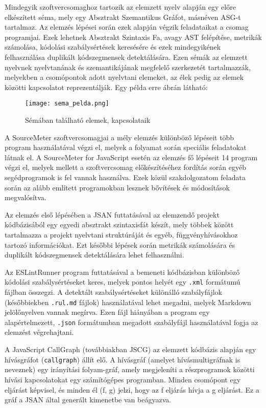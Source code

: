 Mindegyik szoftvercsomaghoz tartozik az elemzett nyelv alapján egy előre elkészített séma, mely egy Absztrakt Szemantikus Gráfot, másnéven ASG-t tartalmaz. Az elemzés lépései során ezek alapján végzik feladataikat a csomag programjai. Ezek lehetnek Absztrakt Szintaxis Fa, avagy AST felépítése, metrikák számolása, kódolási szabálysértések keresésére és ezek mindegyikének felhasználása duplikált kódszegmensek detektálására.
Ezen sémák az elemzett nyelvnek nyelvtanának és szemantikájának megfelelő szerkezetét tartalmazzák, melyekben a csomópontok adott nyelvtani elemeket, az élek pedig az elemek közötti kapcsolatot reprezentálják. Egy példa erre  ábrán látható:

\begin{figure}[!htbp]
    \caption{Sémában található elemek, kapcsolataik}\label{fig:sema_pelda}
    \centering
    \texttt{[image: sema\_pelda.png]}
\end{figure}

A SourceMeter szoftvercsomagjai a mély elemzés különböző lépéseit több program használatával végzi el, melyek a folyamat során speciális feladatokat látnak el. A SourceMeter for JavaScript esetén az elemzés fő lépéseit 14 program végzi el, melyek mellett a szoftvercsomag előkészítéséhez fordítás során egyéb segédprogramok is fel vannak használva. Ezek közül szakdolgozatom feladata során az alább említett programokban lesznek bővítések és módosítások megvalósítva.

Az elemzés első lépésében a JSAN futtatásával az elemzendő projekt kódbázisából egy egyedi absztrakt szintaxisfát készít, mely többek között tartalmazza a projekt nyelvtani struktúráját és egyéb, függvényhívásokhoz tartozó információkat. Ezt későbbi lépések során metrikák számolására és duplikált kódszegmensek detektálására lehet felhasználni.

Az ESLintRunner program futtatásával a bemeneti kódbázisban különböző kódolási szabálysértéseket keres, melyek pontos helyét egy \texttt{.xml} formátumú fájlban összegzi. A detektált szabálysértéseket különálló szabályfájlok (későbbiekben \texttt{.rul.md} fájlok) használatával lehet megadni, melyek Markdown jelölőnyelven vannak megírva. Ezen fájl hiányában a program egy alapértelmezett, \texttt{.json} formátumban megadott szabályfájl használatával fogja az elemzést végrehajtani.

A JavaScript CallGraph (továbbiakban JSCG) az elemzett kódbázis alapján egy hívásgráfot (\texttt{callgraph}) állít elő. A hívásgráf (amelyet hívásmultigráfnak is neveznek) egy irányítási folyam-gráf, amely megjeleníti a részprogramok közötti hívási kapcsolatokat egy számítógépes programban. Minden csomópont egy eljárást képvisel, és minden él (f, g) jelzi, hogy az f eljárás hívja a g eljárást. Ez a gráf a JSAN által generált kimenetbe van beágyazva.

